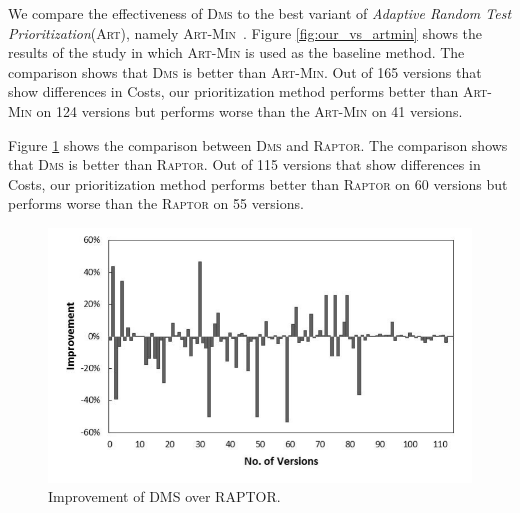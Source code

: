 \vspace{0.2cm}
We compare the effectiveness of \textsc{Dms} to the best variant of {\em Adaptive Random Test Prioritization}(\textsc{Art}), namely \textsc{Art-Min}~\citep{JiangZCT09, Gonzalez-SanchezPAGG11, Alberto2011}. Figure \ref{fig:our_vs_artmin} shows the results of the study in which \textsc{Art-Min} is used as the baseline method. The comparison shows that \textsc{Dms} is better than \textsc{Art-Min}. Out of 165 versions that show differences in Costs, our prioritization method performs better than \textsc{Art-Min} on 124 versions but performs worse than the \textsc{Art-Min} on 41 versions.


\vspace{0.2cm}
Figure \ref{fig:our_vs_ag_unix} shows the comparison between \textsc{Dms} and \textsc{Raptor}. The comparison shows that \textsc{Dms} is better than \textsc{Raptor}.  Out of 115 versions that show differences in Costs, our prioritization method performs better than \textsc{Raptor} on 60 versions but performs worse than the \textsc{Raptor} on 55 versions.


\begin{figure}[!htbp]
    \centering
    \includegraphics[width=12cm]{mut-dms-raptor.pdf}
\caption{Improvement of D{\scriptsize MS} over R{\scriptsize APTOR}.}
    \label{fig:our_vs_ag_unix}
\end{figure}

